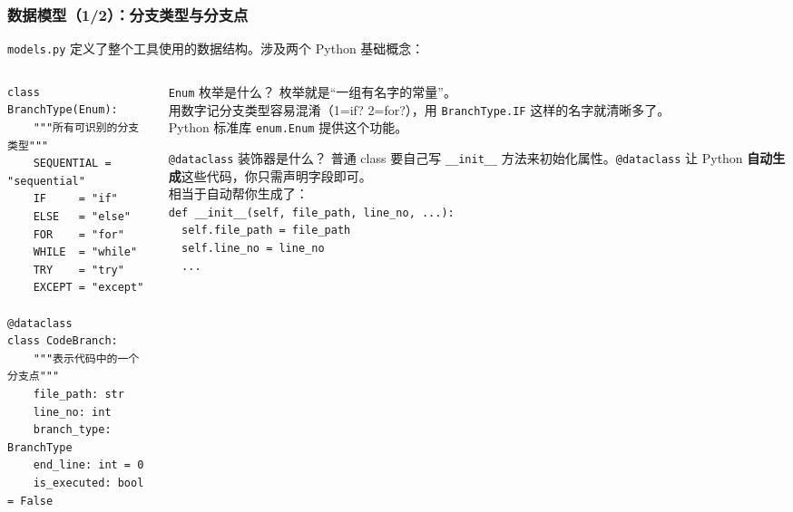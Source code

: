 \documentclass[presentation,aspectratio=169,fontset=none]{ctexbeamer}
\begin{document}

\begin{frame}[fragile]
\frametitle{数据模型（1/2）：分支类型与分支点}
{\footnotesize \texttt{models.py} 定义了整个工具使用的数据结构。涉及两个 Python 基础概念：}

\vspace{0.1cm}
\begin{columns}[T]
\begin{column}{0.55\textwidth}
{\scriptsize
\begin{verbatim}
class BranchType(Enum):
    """所有可识别的分支类型"""
    SEQUENTIAL = "sequential"
    IF     = "if"
    ELSE   = "else"
    FOR    = "for"
    WHILE  = "while"
    TRY    = "try"
    EXCEPT = "except"

@dataclass
class CodeBranch:
    """表示代码中的一个分支点"""
    file_path: str
    line_no: int
    branch_type: BranchType
    end_line: int = 0
    is_executed: bool = False
\end{verbatim}}
\end{column}
\begin{column}{0.42\textwidth}
\begin{block}{\scriptsize \texttt{Enum} 枚举是什么？}
{\scriptsize 枚举就是``一组有名字的常量''。\\[2pt]
用数字记分支类型容易混淆（1=if? 2=for?），用 \texttt{BranchType.IF} 这样的名字就清晰多了。\\[2pt]
Python 标准库 \texttt{enum.Enum} 提供这个功能。}
\end{block}
\vspace{0.05cm}
\begin{block}{\scriptsize \texttt{@dataclass} 装饰器是什么？}
{\scriptsize 普通 class 要自己写 \texttt{\_\_init\_\_} 方法来初始化属性。\texttt{@dataclass} 让 Python \textbf{自动生成}这些代码，你只需声明字段即可。\\[2pt]
相当于自动帮你生成了：\\
\texttt{def \_\_init\_\_(self, file\_path, line\_no, ...):}\\
\texttt{~~self.file\_path = file\_path}\\
\texttt{~~self.line\_no = line\_no}\\
\texttt{~~...}}
\end{block}
\end{column}
\end{columns}
\end{frame}

\end{document}
